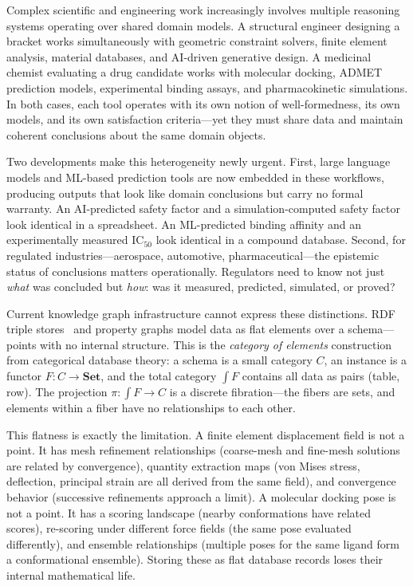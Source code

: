 \documentclass[10pt,twocolumn,letterpaper]{article}
\newcommand{\Set}{\mathbf{Set}}
\begin{document}
Complex scientific and engineering work increasingly involves multiple reasoning systems operating over shared domain models.
A structural engineer designing a bracket works simultaneously with geometric constraint solvers, finite element analysis, material databases, and AI-driven generative design.
A medicinal chemist evaluating a drug candidate works with molecular docking, ADMET prediction models, experimental binding assays, and pharmacokinetic simulations.
In both cases, each tool operates with its own notion of well-formedness, its own models, and its own satisfaction criteria---yet they must share data and maintain coherent conclusions about the same domain objects.

Two developments make this heterogeneity newly urgent.
First, large language models and ML-based prediction tools are now embedded in these workflows, producing outputs that look like domain conclusions but carry no formal warranty.
An AI-predicted safety factor and a simulation-computed safety factor look identical in a spreadsheet.
An ML-predicted binding affinity and an experimentally measured IC$_{50}$ look identical in a compound database.
Second, for regulated industries---aerospace, automotive, pharmaceutical---the epistemic status of conclusions matters operationally.
Regulators need to know not just \emph{what} was concluded but \emph{how}: was it measured, predicted, simulated, or proved?

Current knowledge graph infrastructure cannot express these distinctions.
RDF triple stores~\cite{rdf} and property graphs model data as flat elements over a schema---points with no internal structure.
This is the \emph{category of elements} construction from categorical database theory: a schema is a small category $C$, an instance is a functor $F: C \to \Set$, and the total category $\int F$ contains all data as pairs (table, row).
The projection $\pi: \int F \to C$ is a discrete fibration---the fibers are sets, and elements within a fiber have no relationships to each other.

This flatness is exactly the limitation.
A finite element displacement field is not a point.
It has mesh refinement relationships (coarse-mesh and fine-mesh solutions are related by convergence), quantity extraction maps (von Mises stress, deflection, principal strain are all derived from the same field), and convergence behavior (successive refinements approach a limit).
A molecular docking pose is not a point.
It has a scoring landscape (nearby conformations have related scores), re-scoring under different force fields (the same pose evaluated differently), and ensemble relationships (multiple poses for the same ligand form a conformational ensemble).
Storing these as flat database records loses their internal mathematical life.
\end{document}
